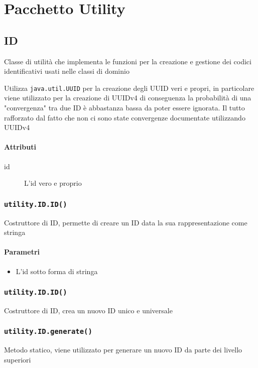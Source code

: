 \section{Pacchetto Utility}
\label{sec:package_utility}

\subsection{ID}
Classe di utilità che implementa le funzioni per la creazione e
gestione dei codici identificativi usati nelle classi di dominio

Utilizza \texttt{java.util.UUID} per la creazione degli UUID veri e
propri, in particolare viene utilizzato per la creazione di UUIDv4 di
conseguenza la probabilità di una "convergenza" tra due ID è
abbastanza bassa da poter essere ignorata. Il tutto rafforzato dal
fatto che non ci sono state convergenze documentate utilizzando UUIDv4

\paragraph{Attributi}
\begin{description}
\item[id] L'id vero e proprio
\end{description}

\subsubsection{\texttt{utility.ID.ID()}}
Costruttore di ID, permette di creare un ID data la sua
rappresentazione come stringa
\paragraph{Parametri}
\begin{itemize}
\item L'id sotto forma di stringa
\end{itemize}

\subsubsection{\texttt{utility.ID.ID()}}
Costruttore di ID, crea un nuovo ID unico e universale

\subsubsection{\texttt{utility.ID.generate()}}
Metodo statico, viene utilizzato per generare un nuovo ID da parte
dei livello superiori
